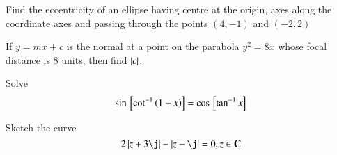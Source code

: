 \documentclass[journal,12pt,twocolumn]{IEEEtran}
\begin{document}
%
\begin{problem}
Find the eccentricity of an ellipse
having centre at the origin, axes along the coordinate
axes and passing through the points $(4, -1)$
and $(-2, 2)$
\end{problem}
%
%
%
%
\begin{problem}
If $y = mx + c$ is the normal at a point
on the parabola $y^2 = 8x$ whose focal distance is 8
units, then find $\left\vert c\right\vert$.
\end{problem}
\begin{problem}
Solve
%
\begin{equation}
\sin {}\left[\cot ^{-1}\left(1+x\right)\right]= \cos{}\left[\tan ^{-1}x\right]
\end{equation}
%
\end{problem}
%
%
%
%
\begin{problem}
Sketch the curve
%
\begin{equation}
2\abs{z+3\j} - \abs{z-\j} = 0, z \in \mbf{C}
\end{equation}
\end{problem}
%
\end{document}
